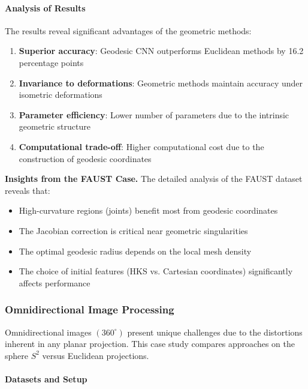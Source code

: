 \paragraph{Analysis of Results}

The results reveal significant advantages of the geometric methods:

\begin{enumerate}
    \item \textbf{Superior accuracy}: Geodesic CNN outperforms Euclidean methods by 16.2 percentage points
    \item \textbf{Invariance to deformations}: Geometric methods maintain accuracy under isometric deformations
    \item \textbf{Parameter efficiency}: Lower number of parameters due to the intrinsic geometric structure
    \item \textbf{Computational trade-off}: Higher computational cost due to the construction of geodesic coordinates
\end{enumerate}

\textbf{Insights from the FAUST Case.} The detailed analysis of the FAUST dataset reveals that:
\begin{itemize}
    \item High-curvature regions (joints) benefit most from geodesic coordinates
    \item The Jacobian correction is critical near geometric singularities
    \item The optimal geodesic radius depends on the local mesh density
    \item The choice of initial features (HKS vs. Cartesian coordinates) significantly affects performance
\end{itemize}

\subsubsection{Omnidirectional Image Processing}\label{subsubsec:imagenes_omnidireccionales}

Omnidirectional images $(360^\circ)$ present unique challenges due to the distortions inherent in any planar projection. This case study compares approaches on the sphere $S^2$ versus Euclidean projections.

\paragraph{Datasets and Setup}

